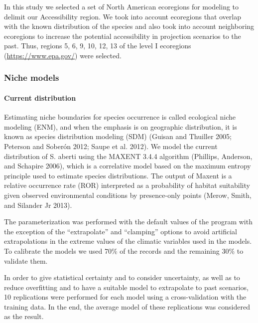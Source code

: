 \documentclass[
]{article}
\begin{document}
In this study we selected a set of North American ecoregions for
modeling to delimit our Accessibility region. We took into account
ecoregions that overlap with the known distribution of the species and
also took into account neighboring ecoregions to increase the potential
accessibility in projection scenarios to the past. Thus, regions 5, 6,
9, 10, 12, 13 of the level I ecoregions (\url{https://www.epa.gov/})
were selected.

\hypertarget{niche-models}{%
\subsubsection{Niche models}\label{niche-models}}

\hypertarget{current-distribution}{%
\paragraph{Current distribution}\label{current-distribution}}

Estimating niche boundaries for species occurrence is called ecological
niche modeling (ENM), and when the emphasis is on geographic
distribution, it is known as species distribution modeling (SDM) (Guisan
and Thuiller 2005; Peterson and Soberón 2012; Saupe et al. 2012). We
model the current distribution of S. aberti using the MAXENT 3.4.4
algorithm (Phillips, Anderson, and Schapire 2006), which is a
correlative model based on the maximum entropy principle used to
estimate species distributions. The output of Maxent is a relative
occurrence rate (ROR) interpreted as a probability of habitat
suitability given observed environmental conditions by presence-only
points (Merow, Smith, and Silander Jr 2013).

The parameterization was performed with the default values of the
program with the exception of the ``extrapolate'' and ``clamping''
options to avoid artificial extrapolations in the extreme values of the
climatic variables used in the models. To calibrate the models we used
70\% of the records and the remaining 30\% to validate them.

In order to give statistical certainty and to consider uncertainty, as
well as to reduce overfitting and to have a suitable model to
extrapolate to past scenarios, 10 replications were performed for each
model using a cross-validation with the training data. In the end, the
average model of these replications was considered as the result.
\end{document}
